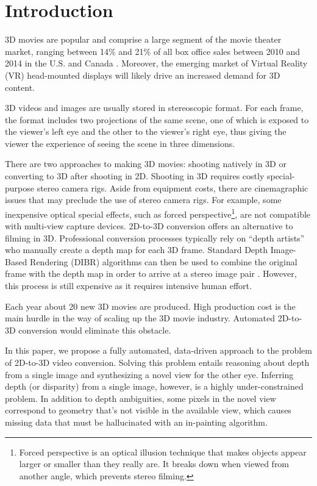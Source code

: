 \documentclass[runningheads]{llncs}
\begin{document}
\section{Introduction}

3D movies are popular and comprise a large segment of the movie theater market, ranging between 14\% and 21\% of all box office sales between 2010 and 2014 in the U.S. and Canada \cite{mpaa}.
Moreover, the emerging market of Virtual Reality (VR) head-mounted displays will likely drive an increased demand for 3D content.

3D videos and images are usually stored in stereoscopic format.
For each frame, the format includes two projections of the same scene, one of which is exposed to the viewer's left eye and the other to the viewer's right eye, thus giving the viewer the experience of seeing the scene in three dimensions.


There are two approaches to making 3D movies: shooting natively in 3D or converting to 3D after shooting in 2D.
Shooting in 3D requires costly special-purpose stereo camera rigs.
Aside from equipment costs, there are cinemagraphic issues that may preclude the use of stereo camera rigs.
For example, some inexpensive optical special effects, such as forced perspective\footnote{Forced perspective is an optical illusion technique that makes objects appear larger or smaller than they really are. It breaks down when viewed from another angle, which prevents stereo filming.}, are not compatible with multi-view capture devices.
2D-to-3D conversion offers an alternative to filming in 3D.
Professional conversion processes typically rely on ``depth artists'' who manually create a depth map for each 3D frame.
Standard Depth Image-Based Rendering (DIBR) algorithms can then be used to combine the original frame with the depth map in order to arrive at a stereo image pair \cite{fehn2004depth}.
However, this process is still expensive as it requires intensive human effort.

Each year about 20 new 3D movies are produced.
High production cost is the main hurdle in the way of scaling up the 3D movie industry.
Automated 2D-to-3D conversion would eliminate this obstacle.

In this paper, we propose a fully automated, data-driven approach to the problem of 2D-to-3D video conversion.
Solving this problem entails reasoning about depth from a single image and synthesizing a novel view for the other eye.
Inferring depth (or disparity) from a single image, however, is a highly under-constrained problem.
In addition to depth ambiguities, some pixels in the novel view correspond to geometry that's not visible in the available view, which causes missing data that must be hallucinated with an in-painting algorithm.
\end{document}
